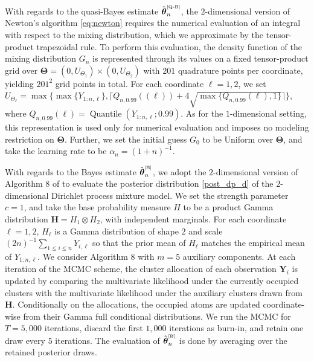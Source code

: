 \documentclass[twoside,12pt]{article}
\begin{document}
With regards to the quasi-Bayes estimate $\hat{\boldsymbol\theta}^{\text{\tiny{[Q-B]}}}_{n}$, the $2$-dimensional version of Newton's algorithm \eqref{eq:newton} requires the numerical evaluation of an integral with respect to the mixing distribution, which we approximate by the tensor-product trapezoidal rule. To perform this evaluation, the density function of the mixing distribution $G_n$ is represented through its values on a fixed tensor-product grid over $\boldsymbol{\Theta}=(0,U_{\Theta_{1}})\times(0,U_{\Theta_{2}})$ with $201$ quadrature points per coordinate, yielding $201^2$ grid points in total. For each coordinate $\ell=1,2$, we set $U_{\Theta_{\ell}}=\max\{\max\{Y_{1:n,\ell}\},\lceil Q_{n,0.99}((\ell))+4\sqrt{\max\{Q_{n,0.99}(\ell),1\}}\rceil\}$,  where $Q_{n,0.99}(\ell)=\operatorname{Quantile}(Y_{1:n,\ell};0.99)$. As for the $1$-dimensional setting, this representation is used only for numerical evaluation and imposes no modeling restriction on $\boldsymbol{\Theta}$. Further, we set the initial guess $G_0$ to be Uniform over $\boldsymbol{\Theta}$, and take the learning rate to be $\alpha_n=(1+n)^{-1}$. 

With regards to the Bayes estimate  $\hat{\boldsymbol{\theta}}^{\text{\tiny{[B]}}}_{n}$, we adopt the $2$-dimensional version of Algorithm 8 of \citet{Nea(00)} to evaluate the  posterior distribution \eqref{post_dp_d} of the $2$-dimensional  Dirichlet process mixture model. We set the strength parameter $c=1$, and take the base  probability measure $H$ to be a product Gamma distribution $\boldsymbol{H}=H_1\otimes H_2$, with independent marginals. For each coordinate $\ell=1,2$, $H_\ell$ is a Gamma distribution of shape $2$ and scale $(2n)^{-1}\sum_{1\leq i\leq n}Y_{i,\ell}$ so that the prior mean of $H_\ell$ matches the empirical mean of $Y_{1:n,\ell}$. We consider Algorithm 8 with $m=5$ auxiliary components.  At each iteration of the MCMC scheme, the cluster allocation of each observation $\boldsymbol Y_i$ is updated by comparing the multivariate likelihood under the currently occupied clusters with the multivariate likelihood under the auxiliary clusters drawn from $\boldsymbol{H}$. Conditionally on the allocations, the occupied atoms are updated coordinate-wise from their Gamma full conditional distributions. We run the MCMC for $T=5,000$ iterations, discard the first $1,000$ iterations as burn-in, and retain one draw every $5$ iterations. The evaluation of $\hat{\boldsymbol{\theta}}^{\text{\tiny{[B]}}}_{n}$ is done by averaging over the retained posterior draws.
\end{document}
